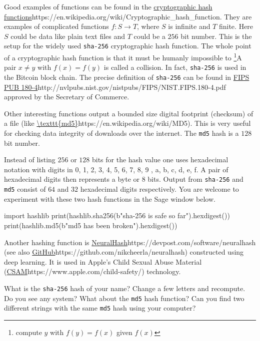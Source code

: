 \documentclass{article}
\begin{document}
\begin{example}\label{crypthashex}
  Good examples of functions can be found in the \url{cryptographic hash functions}{https://en.wikipedia.org/wiki/Cryptographic_hash_function}. They are examples of complicated functions $f:S \rightarrow T$, where
  $S$ is infinite and $T$ finite. Here $S$ could be data like plain text files and $T$ could be
  a $256$ bit number. This is the setup for the widely used \texttt{sha-256} cryptographic hash function.
  The whole point of a cryptographic hash function is that it must be humanly impossible to
  \footnote{compute $y$ with $f(y) = f(x)$ given $f(x)$}{A pair $x\neq y$ with $f(x) = f(y)$ is called a collision}. 
  In fact, \texttt{sha-256} is used in the Bitcoin block chain. The precise definition of
  \texttt{sha-256} can be found in \url{FIPS PUB 180-4}{http://nvlpubs.nist.gov/nistpubs/FIPS/NIST.FIPS.180-4.pdf} approved by the Secretary of Commerce.

Other interesting functions output a bounded size digital footprint (checksum) of a file (like \url{\texttt{md5}}{https://en.wikipedia.org/wiki/MD5}). This is very useful
for checking data integrity of downloads over the internet. The \texttt{md5} hash is a $128$ bit number.

Instead of listing $256$ or $128$ bits for the hash value one uses hexadecimal notation with digits
in 0, 1, 2, 3, 4, 5, 6, 7, 8, 9 , a, b, c, d, e, f. A pair of hexadecimal digits then represents
a byte or $8$ bits. Output from \texttt{sha-256} and \texttt{md5} consist of $64$ and $32$ hexadecimal
digits respectively. You are welcome to experiment with these two hash functions in the
Sage window below.



\begin{sage}
import hashlib
print(hashlib.sha256(b"sha-256 is safe so far").hexdigest())
print(hashlib.md5(b"md5 has been broken").hexdigest())
\end{sage}

Another hashing function is \url{NeuralHash}{https://devpost.com/software/neuralhash} (see also \url{GitHub}{https://github.com/nikcheerla/neuralhash}) constructed using deep learning. It is used in Apple's Child
Sexual Abuse Material (\url{CSAM}{https://www.apple.com/child-safety/}) technology.
\end{example}


\beginshex
What is the \texttt{sha-256} hash of your name? Change a
few letters and recompute. Do you see any system? What about the \texttt{md5} hash function?
Can you find two different strings with the same \texttt{md5} hash using your computer?
\end{document}
